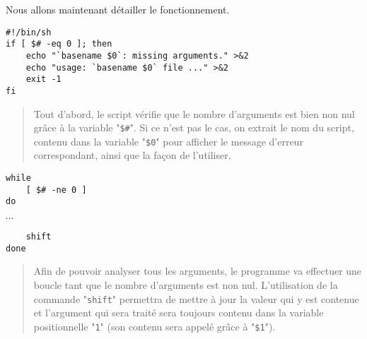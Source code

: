 Nous allons maintenant d{\'e}tailler le fonctionnement.

\begin{verbatim}
#!/bin/sh
if [ $# -eq 0 ]; then
    echo "`basename $0`: missing arguments." >&2
    echo "usage: `basename $0` file ..." >&2
    exit -1
fi
\end{verbatim}
\begin{quote}

Tout d'abord, le script v{\'e}rifie que le nombre d'arguments est bien non nul gr{\^a}ce
{\`a} la variable "\verb,$#,". Si ce n'est pas le cas, on extrait le nom du
script, contenu dans la variable "\verb,$0," pour afficher le message d'erreur
correspondant, ainsi que la fa\c{c}on de l'utiliser.
\end{quote}

\begin{verbatim}
while
    [ $# -ne 0 ]
do
\end{verbatim}
\vspace{2ex}
$\cdots$
\\[2ex]
\begin{verbatim}
    shift
done
\end{verbatim}
\begin{quote}
Afin de pouvoir analyser tous les arguments, le programme va effectuer une boucle
tant que le nombre d'arguments est non nul. L'utilisation de la commande "{\tt shift}"
permettra de mettre {\`a} jour la valeur qui y est contenue et l'argument qui sera trait{\'e} sera
toujours contenu dans la variable positionnelle "{\tt 1}" (son contenu sera appel{\'e} gr{\^a}ce
{\`a} "\verb=$1=").
\end{quote}

